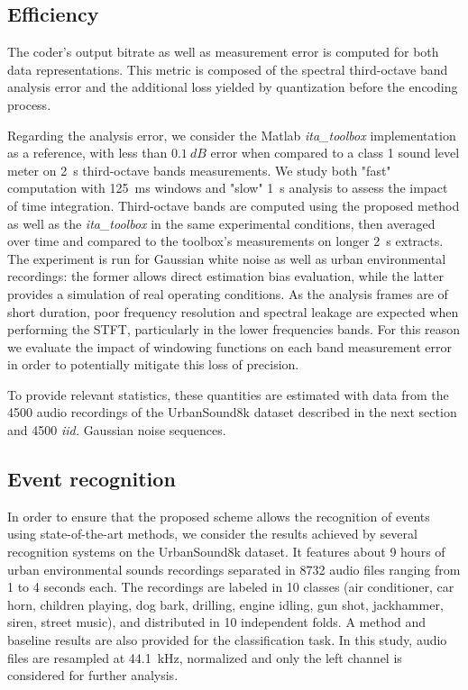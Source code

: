\documentclass[sensors,article,submit,moreauthors,pdftex,10pt,a4paper]{mdpi}
\begin{document}
\subsection{Efficiency} \label{sec:efficiency_p}

The coder's output bitrate as well as measurement error is computed for both data representations. This metric is composed of the spectral third-octave band analysis error and the additional loss yielded by quantization before the encoding process.

Regarding the analysis error, we consider the Matlab \textit{ita\_toolbox} implementation \cite{itatoolbox2017} as a reference, with less than $0.1~dB$ error when compared to a class 1 sound level meter on 2~s third-octave bands measurements. We study both "fast" computation with 125~ms windows and "slow" 1~s analysis to assess the impact of time integration. Third-octave bands are computed using the proposed method as well as the \textit{ita\_toolbox} in the same experimental conditions, then averaged over time and compared to the toolbox's measurements on longer 2~s extracts. The experiment is run for Gaussian white noise as well as urban environmental recordings: the former allows direct estimation bias evaluation, while the latter provides a simulation of real operating conditions. As the analysis frames are of short duration, poor frequency resolution and spectral leakage are expected when performing the STFT, particularly in the lower frequencies bands. For this reason we evaluate the impact of windowing functions on each band measurement error in order to potentially mitigate this loss of precision. 

To provide relevant statistics, these quantities are estimated with data from the 4500 audio recordings of the UrbanSound8k dataset \cite{salamon2014} described in the next section and 4500 \textit{iid.} Gaussian noise sequences.

\subsection{Event recognition} \label{sec:event_p}

In order to ensure that the proposed scheme allows the recognition of events using state-of-the-art methods, we consider the results achieved by several recognition systems on the UrbanSound8k dataset\cite{salamon2014}. It features about 9 hours of urban environmental sounds recordings separated in 8732 audio files ranging from 1 to 4 seconds each. The recordings are labeled in 10 classes (air conditioner, car horn, children playing, dog bark, drilling, engine idling, gun shot, jackhammer, siren, street music), and distributed in 10 independent folds. A method and baseline results are also provided for the classification task. In this study, audio files are resampled at 44.1~kHz, normalized and only the left channel is considered for further analysis.
\end{document}
